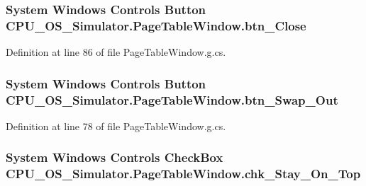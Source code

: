 \subsubsection[{btn\+\_\+\+Close}]{\setlength{\rightskip}{0pt plus 5cm}System Windows Controls Button C\+P\+U\+\_\+\+O\+S\+\_\+\+Simulator.\+Page\+Table\+Window.\+btn\+\_\+\+Close\hspace{0.3cm}{\ttfamily [package]}}\label{class_c_p_u___o_s___simulator_1_1_page_table_window_ab50f72dcb40e44d6eadb0128c67eace6}


Definition at line 86 of file Page\+Table\+Window.\+g.\+cs.

\hypertarget{class_c_p_u___o_s___simulator_1_1_page_table_window_ae8b5191737208bc156dea5312230c716}{}
\subsubsection[{btn\+\_\+\+Swap\+\_\+\+Out}]{\setlength{\rightskip}{0pt plus 5cm}System Windows Controls Button C\+P\+U\+\_\+\+O\+S\+\_\+\+Simulator.\+Page\+Table\+Window.\+btn\+\_\+\+Swap\+\_\+\+Out\hspace{0.3cm}{\ttfamily [package]}}\label{class_c_p_u___o_s___simulator_1_1_page_table_window_ae8b5191737208bc156dea5312230c716}


Definition at line 78 of file Page\+Table\+Window.\+g.\+cs.

\hypertarget{class_c_p_u___o_s___simulator_1_1_page_table_window_ab0e68128fbf4eb0e840d0d6179517e0f}{}
\subsubsection[{chk\+\_\+\+Stay\+\_\+\+On\+\_\+\+Top}]{\setlength{\rightskip}{0pt plus 5cm}System Windows Controls Check\+Box C\+P\+U\+\_\+\+O\+S\+\_\+\+Simulator.\+Page\+Table\+Window.\+chk\+\_\+\+Stay\+\_\+\+On\+\_\+\+Top\hspace{0.3cm}{\ttfamily [package]}}\label{class_c_p_u___o_s___simulator_1_1_page_table_window_ab0e68128fbf4eb0e840d0d6179517e0f}


